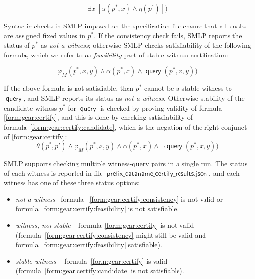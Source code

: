 \documentclass[a4paper,parskip=half]{article} %
\newcommand*\query{\operatorname{\mathsf{query}}}
\newcommand*\suffix[1]{\operatorname{\mathsf{#1}}} %
\begin{document}
\begin{equation}\label{form:gear:certify:consistency}
\exists x~ [\alpha(p^*, x) \wedge \eta(p^*)])
\end{equation}


Syntactic checks in SMLP imposed on the specification file ensure that all knobs are assigned fixed values in $p^*$.  
If the consistency check fails, SMLP reports the status of $p^*$ as \emph{not a witness}; otherwise SMLP checks satisfiability 
of the following formula, which we refer to as \emph{feasibility} part of stable witness certification:

\begin{equation}\label{form:gear:certify:feasibility}
       \varphi_M(p^*,x,y)  \wedge  \alpha(p^*,x) \wedge   \query(p^*,x,y))
\end{equation}

If the above formula is not satisfiable, then $p^*$ cannot be a stable witness to $\query$, and SMLP reports its status as \emph{not a witness}. 
Otherwise stability of the candidate witness $p^*$ for $\query$ is checked by proving validity of formula \cref{form:gear:certify},
and this is done by checking satisfiability of formula~\cref{form:gear:certify:candidate}, which is the negation of the right conjunct of \cref{form:gear:certify}:
\begin{equation}\label{form:gear:certify:candidate}
     \theta(p^*, p')  \wedge  \varphi_M(p^*,x,y)  \wedge  \alpha(p^*,x) \wedge   \neg \query(p^*,x,y))
\end{equation}


SMLP supports checking multiple witness-query pairs in a single run. The status of each witness is reported in file 
 $\suffix{prefix\_dataname\_certify\_results.json}$, and each witness has one of these three status options:   
\begin{itemize}
\item \emph{not a witness} --formula ~\cref{form:gear:certify:consistency} is not valid or formula~\cref{form:gear:certify:feasibility} is not satisfiable.  
\item \emph{witness, not stable} -- formula~\cref{form:gear:certify} is not valid 
(formula~\cref{form:gear:certify:consistency} might still be valid and  formula~\cref{form:gear:certify:feasibility} satisfiable).
\item \emph{stable witness} -- formula~\cref{form:gear:certify} is valid (formula~\cref{form:gear:certify:candidate} is not satisfiable).
\end{itemize}
\end{document}
